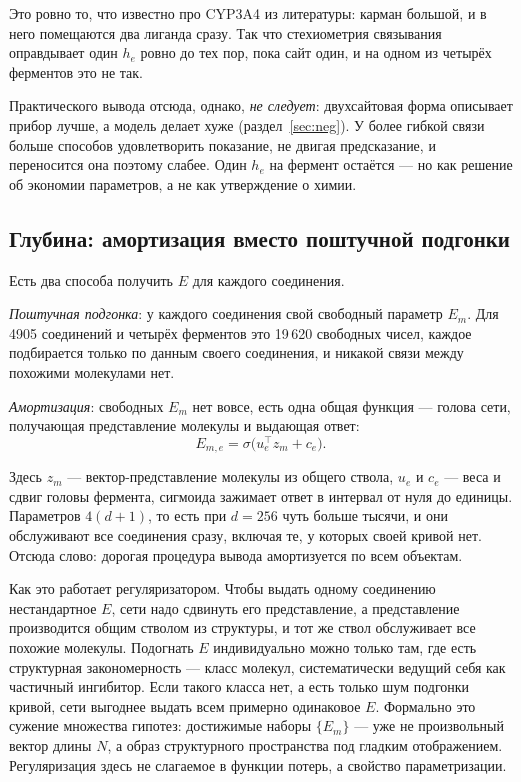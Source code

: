 Это ровно то, что известно про CYP3A4 из литературы: карман большой, и в него помещаются два лиганда
сразу. Так что стехиометрия связывания оправдывает один $h_e$ ровно до тех пор, пока сайт один, и на
одном из четырёх ферментов это не так.

Практического вывода отсюда, однако, \emph{не следует}: двухсайтовая форма описывает прибор лучше, а
модель делает хуже (раздел~\ref{sec:neg}). У более гибкой связи больше способов удовлетворить
показание, не двигая предсказание, и переносится она поэтому слабее. Один $h_e$ на фермент остаётся ---
но как решение об экономии параметров, а не как утверждение о химии.

\subsection{Глубина: амортизация вместо поштучной подгонки}

Есть два способа получить $E$ для каждого соединения.

\emph{Поштучная подгонка}: у каждого соединения свой свободный параметр $E_m$. Для 4905 соединений
и четырёх ферментов это 19\,620 свободных чисел, каждое подбирается только по данным своего соединения,
и никакой связи между похожими молекулами нет.

\emph{Амортизация}: свободных $E_m$ нет вовсе, есть одна общая функция --- голова сети, получающая
представление молекулы и выдающая ответ:
\begin{equation}
E_{m,e} = \sigma\bigl(u_e^{\top} z_m + c_e\bigr) .
\label{eq:eamort}
\end{equation}

Здесь $z_m$ --- вектор-представление молекулы из общего ствола, $u_e$ и $c_e$ --- веса и сдвиг головы
фермента, сигмоида зажимает ответ в интервал от нуля до единицы. Параметров $4(d+1)$, то есть при $d=256$
чуть больше тысячи, и они обслуживают все соединения сразу, включая те, у которых своей кривой нет.
Отсюда слово: дорогая процедура вывода амортизуется по всем объектам.

Как это работает регуляризатором. Чтобы выдать одному соединению нестандартное
$E$, сети надо сдвинуть его представление, а представление производится общим стволом из структуры, и тот же
ствол обслуживает все похожие молекулы. Подогнать $E$ индивидуально можно только там, где есть структурная
закономерность --- класс молекул, систематически ведущий себя как частичный ингибитор. Если такого класса
нет, а есть только шум подгонки кривой, сети выгоднее выдать всем примерно одинаковое $E$. Формально это
сужение множества гипотез: достижимые наборы $\{E_m\}$ --- уже не произвольный вектор длины $N$, а образ
структурного пространства под гладким отображением. Регуляризация здесь не слагаемое в функции потерь,
а свойство параметризации.

